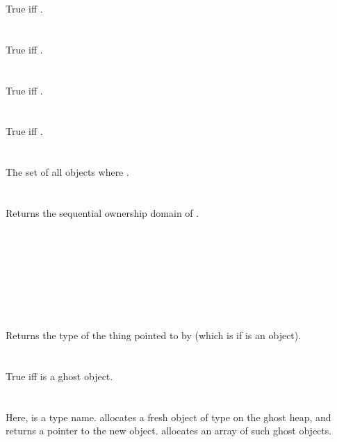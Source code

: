 \documentclass[preprint,nocopyrightspace]{sigplanconf}
\begin{document}
{{{True iff .
\\\\
\\
True iff .
\\\\
\\
True iff .
\\\\
\\
True iff . 
\\\\
\\
The set of all objects  where .
\\\\
\\
Returns the sequential ownership domain of .
\\\\
\vcc{_(\objset \vdomain(\object))}\\
\\\\
\\
\\\\
\\
Returns the type of the thing pointed to by 
(which is  if  is an object).
\\\\
\\
True iff  is a ghost object.
\\
\\
\\
Here,  is a type name.  allocates a fresh object
of type  on the ghost heap, and returns a pointer to the new
object.  allocates an array of  such
ghost objects.


}}}
\end{document}
